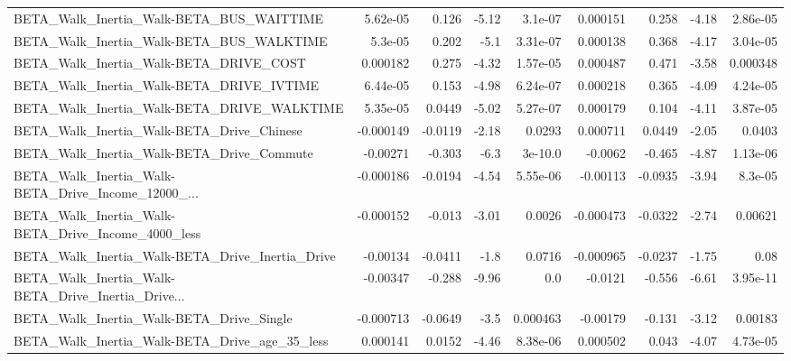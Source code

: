 \begin{tabular}{lrrrrrrrr}
BETA\_Walk\_Inertia\_Walk-BETA\_BUS\_WAITTIME           &    5.62e-05 &        0.126 &    -5.12 &  3.1e-07 &   0.000151 &       0.258 &        -4.18 &      2.86e-05 \\
BETA\_Walk\_Inertia\_Walk-BETA\_BUS\_WALKTIME           &     5.3e-05 &        0.202 &     -5.1 & 3.31e-07 &   0.000138 &       0.368 &        -4.17 &      3.04e-05 \\
BETA\_Walk\_Inertia\_Walk-BETA\_DRIVE\_COST             &    0.000182 &        0.275 &    -4.32 & 1.57e-05 &   0.000487 &       0.471 &        -3.58 &      0.000348 \\
BETA\_Walk\_Inertia\_Walk-BETA\_DRIVE\_IVTIME           &    6.44e-05 &        0.153 &    -4.98 & 6.24e-07 &   0.000218 &       0.365 &        -4.09 &      4.24e-05 \\
BETA\_Walk\_Inertia\_Walk-BETA\_DRIVE\_WALKTIME         &    5.35e-05 &       0.0449 &    -5.02 & 5.27e-07 &   0.000179 &       0.104 &        -4.11 &      3.87e-05 \\
BETA\_Walk\_Inertia\_Walk-BETA\_Drive\_Chinese          &   -0.000149 &      -0.0119 &    -2.18 &   0.0293 &   0.000711 &      0.0449 &        -2.05 &        0.0403 \\
BETA\_Walk\_Inertia\_Walk-BETA\_Drive\_Commute          &    -0.00271 &       -0.303 &     -6.3 &  3e-10.0 &    -0.0062 &      -0.465 &        -4.87 &      1.13e-06 \\
BETA\_Walk\_Inertia\_Walk-BETA\_Drive\_Income\_12000\_... &   -0.000186 &      -0.0194 &    -4.54 & 5.55e-06 &   -0.00113 &     -0.0935 &        -3.94 &       8.3e-05 \\
BETA\_Walk\_Inertia\_Walk-BETA\_Drive\_Income\_4000\_less &   -0.000152 &       -0.013 &    -3.01 &   0.0026 &  -0.000473 &     -0.0322 &        -2.74 &       0.00621 \\
BETA\_Walk\_Inertia\_Walk-BETA\_Drive\_Inertia\_Drive    &    -0.00134 &      -0.0411 &     -1.8 &   0.0716 &  -0.000965 &     -0.0237 &        -1.75 &          0.08 \\
BETA\_Walk\_Inertia\_Walk-BETA\_Drive\_Inertia\_Drive... &    -0.00347 &       -0.288 &    -9.96 &      0.0 &    -0.0121 &      -0.556 &        -6.61 &      3.95e-11 \\
BETA\_Walk\_Inertia\_Walk-BETA\_Drive\_Single           &   -0.000713 &      -0.0649 &     -3.5 & 0.000463 &   -0.00179 &      -0.131 &        -3.12 &       0.00183 \\
BETA\_Walk\_Inertia\_Walk-BETA\_Drive\_age\_35\_less      &    0.000141 &       0.0152 &    -4.46 & 8.38e-06 &   0.000502 &       0.043 &        -4.07 &      4.73e-05 \\

\end{tabular}
